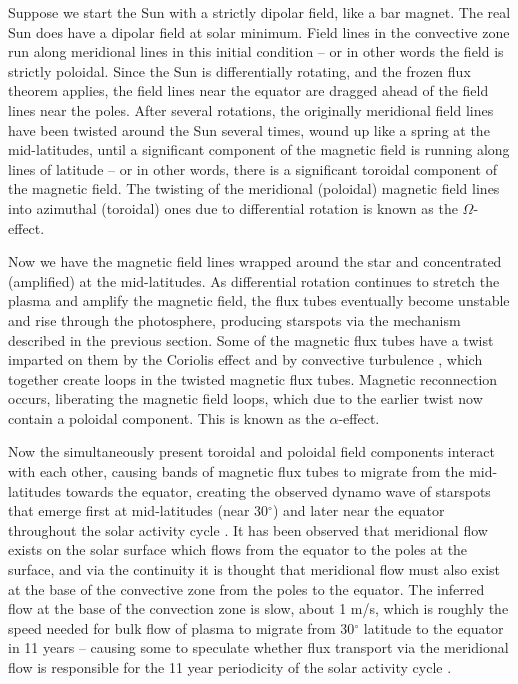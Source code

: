 Suppose we start the Sun with a strictly dipolar field, like a bar magnet. The real Sun does have a dipolar field at solar minimum. Field lines in the convective zone run along meridional lines in this initial condition -- or in other words the field is strictly poloidal. Since the Sun is differentially rotating, and the frozen flux theorem applies, the field lines near the equator are dragged ahead of the field lines near the poles. After several rotations, the originally meridional field lines have been twisted around the Sun several times, wound up like a spring at the mid-latitudes, until a significant component of the magnetic field is running along lines of latitude -- or in other words, there is a significant toroidal component of the magnetic field. The twisting of the meridional (poloidal) magnetic field lines into azimuthal (toroidal) ones due to differential rotation is known as the $\Omega$-effect. 

Now we have the magnetic field lines wrapped around the star and concentrated (amplified) at the mid-latitudes. As differential rotation continues to stretch the plasma and amplify the magnetic field, the flux tubes eventually become unstable and rise through the photosphere, producing starspots via the mechanism described in the previous section. Some of the magnetic flux tubes have a twist imparted on them by the Coriolis effect and by convective turbulence \citep{Parker1955a, Parker1955b}, which together create loops in the twisted magnetic flux tubes. Magnetic reconnection occurs, liberating the magnetic field loops, which due to the earlier twist now contain a poloidal component. This is known as the $\alpha$-effect. 

Now the simultaneously present toroidal and poloidal field components interact with each other, causing bands of magnetic flux tubes to migrate from the mid-latitudes towards the equator, creating the observed dynamo wave of starspots that emerge first at mid-latitudes (near 30$^\circ$) and later near the equator throughout the solar activity cycle \citep{Parker1955a, Parker1955b}. It has been observed that meridional flow exists on the solar surface which flows from the equator to the poles at the surface, and via the continuity it is thought that meridional flow must also exist at the base of the convective zone from the poles to the equator. The inferred flow at the base of the convection zone is slow, about 1 m/s, which is roughly the speed needed for bulk flow of plasma to migrate from 30$^\circ$ latitude to the equator in 11 years -- causing some to speculate whether flux transport via the meridional flow is responsible for the 11 year periodicity of the solar activity cycle \citep{Dikpati2006,Hathaway2010}. 

